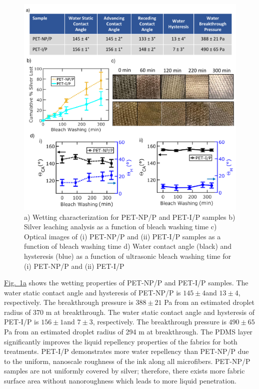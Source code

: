 \documentclass[journal=jacsat,manuscript=article]{achemso}
\newcommand{\figref}[2][]{\hyperref[#2]{Fig.~\ref{#2}#1}}
\begin{document}
\begin{figure}[H]
       \centering
    \includegraphics[width= \linewidth]{Figures/fig_wash2.pdf}
\caption[Durability]{a) Wetting characterization for PET-NP/P and PET-I/P samples b) Silver leaching analysis as a function of bleach washing time c) Optical images of (i) PET-NP/P and (ii) PET-I/P samples as a function of bleach washing time d) Water contact angle (black) and hysteresis (blue) as a function of ultrasonic bleach washing time for (i) PET-NP/P and (ii) PET-I/P}%
\label{fig:durable2}
\end{figure}

\figref[a]{fig:durable2} shows the wetting properties of PET-NP/P and PET-I/P samples. The water static contact angle and hysteresis of PET-NP/P is $145 \pm 4$\degree and $13 \pm 4$\degree, respectively. The breakthrough pressure is $388 \pm 21$ Pa from an estimated droplet radius of 370 \micro m at breakthrough. The water static contact angle and hysteresis of PET-I/P is $156 \pm 1$\degree and $7 \pm 3$\degree, respectively. The breakthrough pressure is $490 \pm 65$ Pa from an estimated droplet radius of 294 \micro m at breakthrough. The PDMS layer significantly improves the liquid repellency properties of the fabrics for both treatments. PET-I/P demonstrates more water repellency than PET-NP/P due to the uniform, nanoscale roughness of the ink along all microfibers. PET-NP/P %
samples are not uniformly covered by silver; therefore, there exists more fabric surface area without nanoroughness which leads to more liquid penetration. 
\end{document}
